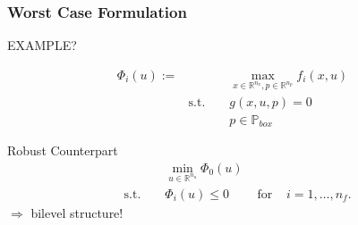 \begin{frame}
\frametitle{Worst Case Formulation}

EXAMPLE?





\begin{align*}
\Phi_{i}(u):= &&& \max_{x\in \mathbb{R}^{n_{x}}, p\in \mathbb{R}^{n_{p}}} f_{i}(x,u)\\
& \text{s.t. } && g(x,u,p)=0\\
&&& p\in\mathbb{P}_{box}
\end{align*}

\begin{block}{Robust Counterpart}
\begin{align*}
&&&\min_{u\in\mathbb{R}^{n_{u}}} \Phi_{0}(u)\\
&\text{s.t. } &&\Phi_{i}(u)\leq 0 & \text{ for } & i=1,\ldots,n_{f}.
\end{align*}
$\Rightarrow$ bilevel structure!
\end{block}

\end{frame}

